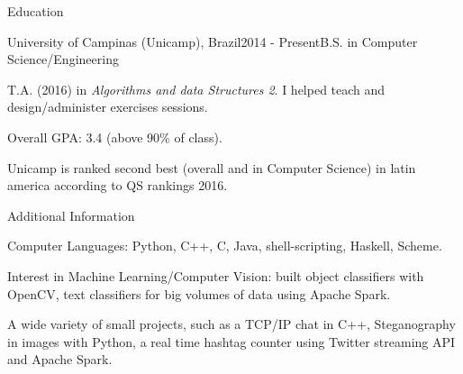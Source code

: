 \documentclass[8pt]{resume}
\newcommand{\tit}[1]{\textit{#1}}
\begin{document}
\begin{rSection}{Education}

\begin{rSubsection}{University of Campinas (Unicamp), Brazil}{2014 - Present}{B.S. in Computer Science/Engineering}{}
    \item T.A. (2016) in \tit{Algorithms and data Structures 2}. I helped
        teach and design/administer exercises sessions.
    \item Overall GPA: 3.4 (above 90\% of class).
    \item Unicamp is ranked second best
        (overall and in Computer Science) in latin america according to
        QS rankings 2016.
\end{rSubsection}

\end{rSection}

\begin{rSection}{Additional Information}

\begin{rSubsection}{}{}{}{}
    \item Computer Languages: Python, C++, C, Java, shell-scripting, Haskell,
        Scheme.
    \item Interest in Machine Learning/Computer Vision:
        built object classifiers with OpenCV,
        text classifiers for big volumes of data using Apache Spark.
    \item A wide variety of small projects, such as a TCP/IP chat in C++,
        Steganography in images with Python, a real time hashtag counter
        using Twitter streaming API and Apache Spark.
\end{rSubsection}

\end{rSection}
\end{document}
